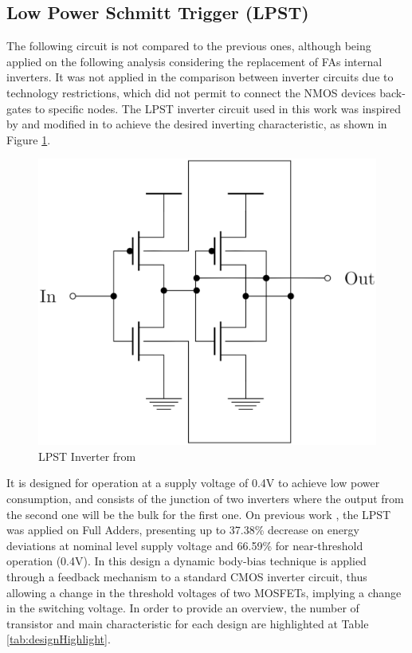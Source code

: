 \documentclass[pgmicro,diss,english]{iiufrgs}
\begin{document}
\subsection{Low Power Schmitt Trigger (LPST)}

The following circuit is not compared to the previous ones, although being applied on the following analysis considering the replacement of FAs internal inverters. It was not applied in the comparison between inverter circuits due to technology restrictions, which did not permit to connect the NMOS devices back-gates to specific nodes. The LPST inverter circuit used in this work was inspired by \cite{zhang2003low} and modified in \cite{dokania2015circuit} to achieve the desired inverting characteristic, as shown in Figure \ref{fig:LPST}.

\begin{figure}[h]
  \centering
  \includegraphics[width=.5\linewidth]{STOriginal.eps}
  \caption{LPST Inverter from \citet{dokania2015circuit}}
  \label{fig:LPST}
\end{figure}

It is designed for operation at a supply voltage of 0.4V to achieve low power consumption, and consists of the junction of two inverters where the output from the second one will be the bulk for the first one. On previous work \cite{moraes2018evaluation}, the LPST was applied on Full Adders, presenting up to 37.38\% decrease on energy deviations at nominal level supply voltage and 66.59\% for near-threshold operation (0.4V). In this design a dynamic body-bias technique is applied through a feedback mechanism to a standard CMOS inverter circuit, thus allowing a change in the threshold voltages of two MOSFETs, implying a change in the switching voltage. In order to provide an overview, the number of transistor and main characteristic for each design are highlighted at Table \ref{tab:designHighlight}.
\end{document}
